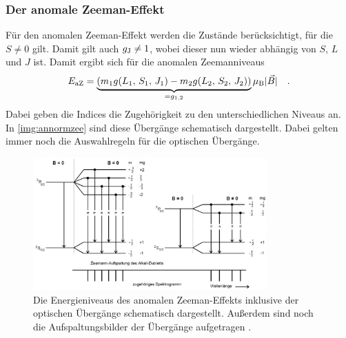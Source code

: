 \subsubsection{Der anomale Zeeman-Effekt}

\noindent
Für den anomalen Zeeman-Effekt werden die Zustände berücksichtigt, für die $S \neq 0$ gilt. 
Damit gilt auch $g_{\text{J}} \neq 1$, wobei dieser nun wieder abhängig von $S$, $L$ und $J$ ist. 
Damit ergibt sich für die anomalen Zeemanniveaus 
\begin{equation}
    E_{\text{aZ}} = \underbrace{(m_1 g(L_1,\, S_1,\, J_1) - m_2 g(L_2,\, S_2,\, J_2))}_{= g_{1,2}} \mu_\text{B} |\vec{B}| \quad .
    \label{eqn:anorm}
\end{equation}
Dabei geben die Indices die Zugehörigkeit zu den unterschiedlichen Niveaus an.\\
In \autoref{img:annormzee} sind diese Übergänge schematisch dargestellt. 
Dabei gelten immer noch die Auswahlregeln für die optischen Übergänge. 
\begin{figure}[H]
    \centering
    \includegraphics[width=0.8\textwidth]{latex/images/anormalerzeeman.PNG}
    \caption{Die Energieniveaus des anomalen Zeeman-Effekts inklusive der optischen Übergänge schematisch dargestellt.
    Außerdem sind noch die Aufspaltungsbilder der Übergänge aufgetragen \protect \cite{alt}.}
    \label{img:annormzee}
\end{figure}